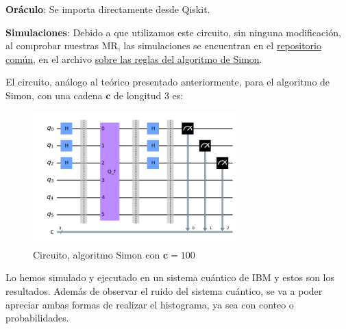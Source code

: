  \vspace{8pt}

 \textbf{Oráculo}: Se importa directamente desde Qiskit.\newline

 \textbf{Simulaciones}: Debido a que utilizamos este circuito, sin ninguna modificación, al comprobar nuestras MR, las simulaciones se encuentran en el \href{https://github.com/rodelanu/TFG/tree/main}{repositorio común}, en el archivo \href{https://github.com/rodelanu/TFG/blob/main/3_Simon_Rules.ipynb}{sobre las reglas del algoritmo de Simon}.

 \vspace{8pt}

 El circuito, análogo al teórico presentado anteriormente, para el algoritmo de Simon, con una cadena $\mathbf{c}$ de longitud 3 es:

 
 \begin{figure}[H]
    \centering
    \includegraphics[width=0.7\textwidth]{TFG/imagenes/simon1.png}
    \caption{Circuito, algoritmo Simon con $\mathbf{c}=100$}
    \label{Fig:CircuitoSimon1}
 \end{figure}

 Lo hemos simulado y ejecutado en un sistema cuántico de IBM y estos son los resultados. Además de observar el ruido del sistema cuántico, se va a poder apreciar ambas formas de realizar el histograma, ya sea con conteo o probabilidades.

